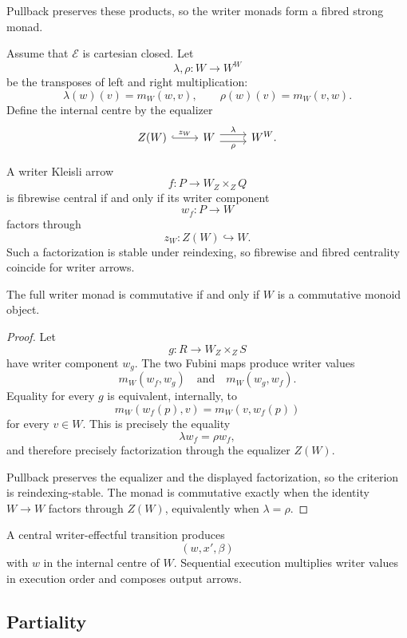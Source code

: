 Pullback preserves these products, so the writer monads form a fibred strong
monad.

Assume that \(\mathcal E\) is cartesian closed.  Let
\[
    \lambda,\rho:W\longrightarrow W^W
\]
be the transposes of left and right multiplication:
\[
    \lambda(w)(v)=m_W(w,v),
    \qquad
    \rho(w)(v)=m_W(v,w).
\]
Define the internal centre by the equalizer
\[
\begin{tikzcd}
    Z(W)
        \arrow[r,hook,"z_W"]
    &
    W
        \arrow[r,shift left=.7ex,"\lambda"]
        \arrow[r,shift right=.7ex,"\rho"']
    &
    W^W.
\end{tikzcd}
\]

\begin{proposition}
\label{prop:central-writer-computations}
A writer Kleisli arrow
\[
    f:P\longrightarrow W_Z\times_ZQ
\]
is fibrewise central if and only if its writer component
\[
    w_f:P\longrightarrow W
\]
factors through
\[
    z_W:Z(W)\hookrightarrow W.
\]
Such a factorization is stable under reindexing, so fibrewise and fibred
centrality coincide for writer arrows.

The full writer monad is commutative if and only if \(W\) is a commutative
monoid object.
\end{proposition}

\begin{proof}
Let
\[
    g:R\longrightarrow W_Z\times_ZS
\]
have writer component \(w_g\).  The two Fubini maps produce writer values
\[
    m_W(w_f,w_g)
    \quad\text{and}\quad
    m_W(w_g,w_f).
\]
Equality for every \(g\) is equivalent, internally, to
\[
    m_W(w_f(p),v)
    =
    m_W(v,w_f(p))
\]
for every \(v\in W\).  This is precisely the equality
\[
    \lambda w_f=\rho w_f,
\]
and therefore precisely factorization through the equalizer \(Z(W)\).

Pullback preserves the equalizer and the displayed factorization, so the
criterion is reindexing-stable.  The monad is commutative exactly when the
identity \(W\to W\) factors through \(Z(W)\), equivalently when
\(\lambda=\rho\).
\end{proof}

A central writer-effectful transition produces
\[
    (w,x',\beta)
\]
with \(w\) in the internal centre of \(W\).  Sequential execution multiplies
writer values in execution order and composes output arrows.

\subsection{Partiality}
\label{subsec:partiality-effect}

